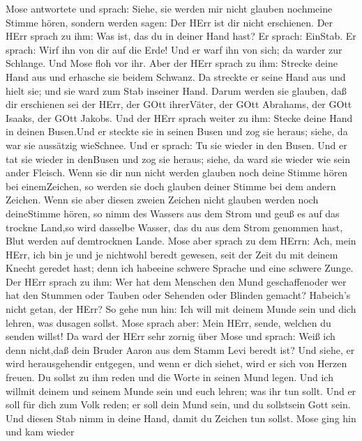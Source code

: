  Mose antwortete und sprach: Siehe, sie werden mir nicht
glauben nochmeine Stimme hören, sondern werden sagen: Der HErr ist dir
nicht erschienen.  Der HErr sprach zu ihm: Was ist, das du
in deiner Hand hast? Er sprach: EinStab.  Er sprach: Wirf
ihn von dir auf die Erde! Und er warf ihn von sich; da warder zur
Schlange. Und Mose floh vor ihr.  Aber der HErr sprach zu
ihm: Strecke deine Hand aus und erhasche sie beidem Schwanz. Da streckte
er seine Hand aus und hielt sie; und sie ward zum Stab inseiner Hand.
 Darum werden sie glauben, daß dir erschienen sei der HErr,
der GOtt ihrerVäter, der GOtt Abrahams, der GOtt Isaaks, der GOtt
Jakobs.  Und der HErr sprach weiter zu ihm: Stecke deine
Hand in deinen Busen.Und er steckte sie in seinen Busen und zog sie
heraus; siehe, da war sie aussätzig wieSchnee.  Und er
sprach: Tu sie wieder in den Busen. Und er tat sie wieder in denBusen
und zog sie heraus; siehe, da ward sie wieder wie sein ander Fleisch.
 Wenn sie dir nun nicht werden glauben noch deine Stimme
hören bei einemZeichen, so werden sie doch glauben deiner Stimme bei dem
andern Zeichen.  Wenn sie aber diesen zweien Zeichen nicht
glauben werden noch deineStimme hören, so nimm des Wassers aus dem Strom
und geuß es auf das trockne Land,so wird dasselbe Wasser, das du aus dem
Strom genommen hast, Blut werden auf demtrocknen Lande. 
Mose aber sprach zu dem HErrn: Ach, mein HErr, ich bin je und je
nichtwohl beredt gewesen, seit der Zeit du mit deinem Knecht geredet
hast; denn ich habeeine schwere Sprache und eine schwere Zunge.
 Der HErr sprach zu ihm: Wer hat dem Menschen den Mund
geschaffenoder wer hat den Stummen oder Tauben oder Sehenden oder
Blinden gemacht? Habeich's nicht getan, der HErr?  So gehe
nun hin: Ich will mit deinem Munde sein und dich lehren, was dusagen
sollst.  Mose sprach aber: Mein HErr, sende, welchen du
senden willst!  Da ward der HErr sehr zornig über Mose und
sprach: Weiß ich denn nicht,daß dein Bruder Aaron aus dem Stamm Levi
beredt ist? Und siehe, er wird herausgehendir entgegen, und wenn er dich
siehet, wird er sich von Herzen freuen.  Du sollst zu ihm
reden und die Worte in seinen Mund legen. Und ich willmit deinem und
seinem Munde sein und euch lehren; was ihr tun sollt.  Und
er soll für dich zum Volk reden; er soll dein Mund sein, und du
sollstsein Gott sein.  Und diesen Stab nimm in deine Hand,
damit du Zeichen tun sollst.  Mose ging hin und kam wieder
